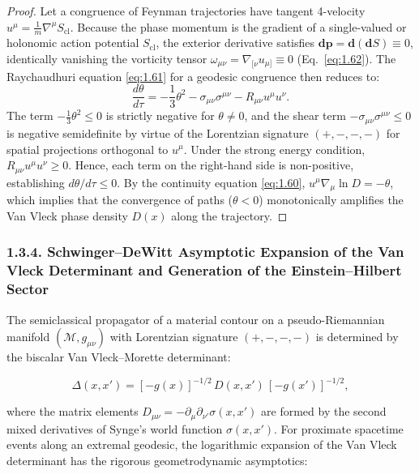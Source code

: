 \documentclass[11pt,a4paper]{article}
\theoremstyle{definition}
\begin{document}
\begin{proof}
Let a congruence of Feynman trajectories have tangent 4-velocity $u^\mu = \frac{1}{m} \nabla^\mu S_{\text{cl}}$. Because the phase momentum is the gradient of a single-valued or holonomic action potential $S_{\text{cl}}$, the exterior derivative satisfies $\mathbf{d}\mathbf{p} = \mathbf{d}(\mathbf{d}S) \equiv 0$, identically vanishing the vorticity tensor $\omega_{\mu\nu} = \nabla_{[\nu} u_{\mu]} \equiv 0$ (Eq.~\eqref{eq:1.62}). The Raychaudhuri equation \eqref{eq:1.61} for a geodesic congruence then reduces to:
\begin{equation*}
\frac{d\theta}{d\tau} = -\frac{1}{3}\theta^2 - \sigma_{\mu\nu}\sigma^{\mu\nu} - R_{\mu\nu} u^\mu u^\nu.
\end{equation*}
The term $-\frac{1}{3}\theta^2 \le 0$ is strictly negative for $\theta \ne 0$, and the shear term $-\sigma_{\mu\nu}\sigma^{\mu\nu} \le 0$ is negative semidefinite by virtue of the Lorentzian signature $(+,-,-,-)$ for spatial projections orthogonal to $u^\mu$. Under the strong energy condition, $R_{\mu\nu} u^\mu u^\nu \ge 0$. Hence, each term on the right-hand side is non-positive, establishing $d\theta/d\tau \le 0$. By the continuity equation \eqref{eq:1.60}, $u^\mu \nabla_\mu \ln D = -\theta$, which implies that the convergence of paths ($\theta < 0$) monotonically amplifies the Van Vleck phase density $D(x)$ along the trajectory.
\end{proof}


\subsubsection{1.3.4. Schwinger--DeWitt Asymptotic Expansion of the Van Vleck Determinant and Generation of the Einstein--Hilbert Sector}\label{sec:1.3.4}

The semiclassical propagator of a material contour on a pseudo-Riemannian manifold $(\mathcal{M}, g_{\mu\nu})$ with Lorentzian signature $(+,-,-,-)$ is determined by the biscalar Van Vleck--Morette determinant:

\begin{equation}\label{eq:1.63a}\tag{1.63a}
\Delta(x, x') = [-g(x)]^{-1/2} \, D(x, x') \, [-g(x')]^{-1/2},
\end{equation}

where the matrix elements $D_{\mu\nu} = -\partial_\mu \partial_{\nu'} \sigma(x, x')$ are formed by the second mixed derivatives of Synge's world function $\sigma(x, x')$. For proximate spacetime events along an extremal geodesic, the logarithmic expansion of the Van Vleck determinant has the rigorous geometrodynamic asymptotics:
\end{document}
